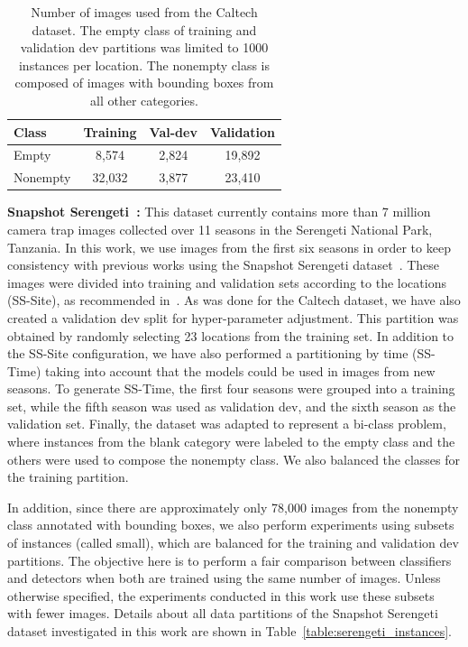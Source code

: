 \begin{table}[htb]
\caption[Number of images used from the Caltech dataset]{Number of images used
from the Caltech dataset. The empty class of training and validation dev
partitions was limited to 1000 instances per location. The nonempty class is
composed of images with bounding boxes from all other categories.}
\begin{center}
\begin{tabular}{l|c|c|c}
\hline
\textbf{Class}   & \textbf{Training} & \textbf{Val-dev} & \textbf{Validation}
\\
\hline \hline
Empty    & 8,574            & 2,824              & 19,892              \\
Nonempty & 32,032           & 3,877              & 23,410              \\
\hline
\end{tabular}
\end{center}
\label{table:caltech_instances}
\end{table}

\textbf{Snapshot Serengeti~\citep{dryad_5pt92}:} This dataset currently contains
more than 7 million camera trap images collected over 11 seasons in the
Serengeti National Park, Tanzania. In this work, we use images from the first
six seasons in order to keep consistency with previous works using the
Snapshot Serengeti dataset~\citep{norouzzadeh2018automatically,
villa2017towards, willi2019identifying}. These images were divided into training
and validation sets according to the locations (SS-Site), as recommended
in~\citep{ss_lila}. As was done for the Caltech dataset, we have also created  a
validation dev split for hyper-parameter adjustment. This partition was obtained
by randomly selecting 23 locations from the training set. In addition to the
SS-Site configuration, we have also performed a partitioning by time (SS-Time)
taking into account that the models could be used in images from new seasons. To
generate SS-Time, the first four seasons were grouped into a training set,
while the fifth season was used as validation dev, and the sixth season as the
validation set. Finally, the dataset was adapted to represent a  bi-class
problem, where instances from the blank category were labeled to the empty
class and the others were used to compose the nonempty class. We also balanced
the classes for the training partition.

In addition, since there are approximately only 78,000 images from the nonempty
class annotated with bounding boxes, we also perform experiments using subsets
of instances (called small), which are balanced for the training and validation
dev partitions. The objective here is to perform a fair comparison between
classifiers and detectors when both are trained using the same number of images.
Unless otherwise specified, the experiments conducted in this work use these
subsets with fewer images. Details about all data partitions of the Snapshot
Serengeti dataset investigated in this work are shown in
Table~\ref{table:serengeti_instances}.


